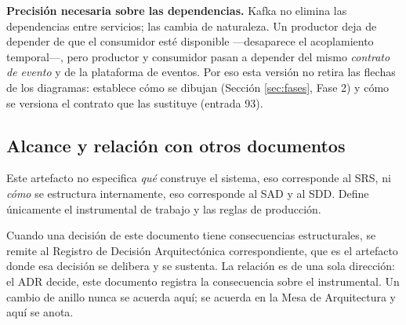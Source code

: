 \documentclass[11pt,a4paper]{article}
\begin{document}
\noindent\textbf{Precisión necesaria sobre las dependencias.} Kafka no elimina las dependencias entre servicios; las cambia de naturaleza. Un productor deja de depender de que el consumidor esté disponible ---desaparece el acoplamiento temporal---, pero productor y consumidor pasan a depender del mismo \emph{contrato de evento} y de la plataforma de eventos. Por eso esta versión no retira las flechas de los diagramas: establece cómo se dibujan (Sección \ref{sec:fases}, Fase 2) y cómo se versiona el contrato que las sustituye (entrada 93).

\subsection{Alcance y relación con otros documentos}

Este artefacto no especifica \emph{qué} construye el sistema, eso corresponde al SRS, ni \emph{cómo} se estructura internamente, eso corresponde al SAD y al SDD. Define únicamente el instrumental de trabajo y las reglas de producción.

Cuando una decisión de este documento tiene consecuencias estructurales, se remite al Registro de Decisión Arquitectónica correspondiente, que es el artefacto donde esa decisión se delibera y se sustenta. La relación es de una sola dirección: el ADR decide, este documento registra la consecuencia sobre el instrumental. Un cambio de anillo nunca se acuerda aquí; se acuerda en la Mesa de Arquitectura y aquí se anota.
\end{document}
